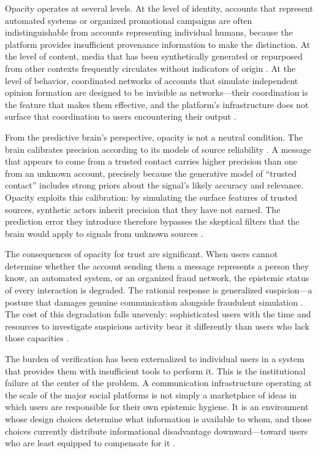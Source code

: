 \documentclass[12pt,a4paper]{article}
\begin{document}
Opacity operates at several levels. At the level of identity, accounts that represent automated
systems or organized promotional campaigns are often indistinguishable from accounts representing
individual humans, because the platform provides insufficient provenance information to make the
distinction. At the level of content, media that has been synthetically generated or repurposed
from other contexts frequently circulates without indicators of origin \citep{vosoughi2018}.
At the level of behavior, coordinated networks of accounts that simulate independent opinion
formation are designed to be invisible as networks---their coordination is the feature that makes
them effective, and the platform's infrastructure does not surface that coordination to users
encountering their output \citep{tufekci2015}.

From the predictive brain's perspective, opacity is not a neutral condition. The brain calibrates
precision according to its models of source reliability \citep{friston2013}. A message that
appears to come from a trusted contact carries higher precision than one from an unknown account,
precisely because the generative model of ``trusted contact'' includes strong priors about the
signal's likely accuracy and relevance. Opacity exploits this calibration: by simulating the
surface features of trusted sources, synthetic actors inherit precision that they have not earned.
The prediction error they introduce therefore bypasses the skeptical filters that the brain would
apply to signals from unknown sources \citep{dallaglio2024,solms2021}.

The consequences of opacity for trust are significant. When users cannot determine whether the
account sending them a message represents a person they know, an automated system, or an
organized fraud network, the epistemic status of every interaction is degraded. The rational
response is generalized suspicion---a posture that damages genuine communication alongside
fraudulent simulation \citep{boyd2014}. The cost of this degradation falls unevenly:
sophisticated users with the time and resources to investigate suspicious activity bear it
differently than users who lack those capacities \citep{noble2018}.

The burden of verification has been externalized to individual users in a system that provides
them with insufficient tools to perform it. This is the institutional failure at the center of
the problem. A communication infrastructure operating at the scale of the major social platforms
is not simply a marketplace of ideas in which users are responsible for their own epistemic
hygiene. It is an environment whose design choices determine what information is available to
whom, and those choices currently distribute informational disadvantage downward---toward users
who are least equipped to compensate for it \citep{noble2018,zuboff2019}.
\end{document}
